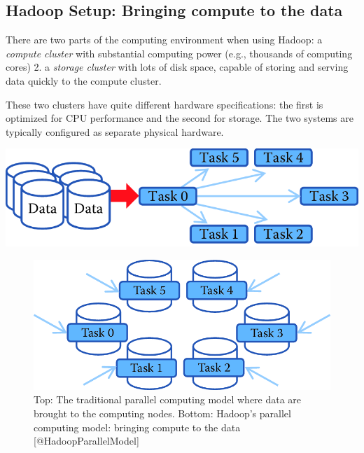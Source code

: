 \documentclass[]{krantz}
\begin{document}
\subsection{Hadoop Setup: Bringing compute to the
data}\label{hadoop-setup-bringing-compute-to-the-data}

There are two parts of the computing environment when using Hadoop: a
\emph{compute cluster} with substantial computing power (e.g., thousands
of computing cores) 2. a \emph{storage cluster} with lots of disk space,
capable of storing and serving data quickly to the compute cluster.

These two clusters have quite different hardware specifications: the
first is optimized for CPU performance and the second for storage. The
two systems are typically configured as separate physical hardware.

\begin{center}\includegraphics[width=0.7\linewidth]{ChapterParallel/figures/data2compute} \end{center}\begin{figure}

{\centering \includegraphics[width=0.7\linewidth]{ChapterParallel/figures/compute2data} 

}

\caption{Top: The traditional parallel computing model where data are brought to the computing nodes. Bottom: Hadoop’s parallel computing model: bringing compute to the data [@HadoopParallelModel]}\label{fig:fig5-1a}
\end{figure}
\end{document}
